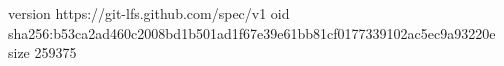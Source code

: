 version https://git-lfs.github.com/spec/v1
oid sha256:b53ca2ad460c2008bd1b501ad1f67e39e61bb81cf0177339102ac5ec9a93220e
size 259375
